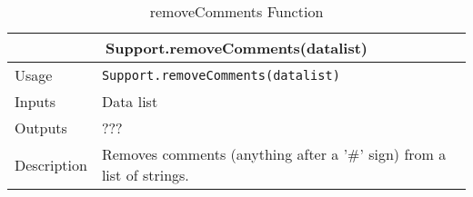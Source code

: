 \begin{table}[H]
\caption{removeComments Function}
\begin{tabular}{ |p{2cm}||p{11cm}|  }
 \hline
 \multicolumn{2}{|c|}{\cellcolor{teal}\textbf{Support.removeComments(datalist)}} \\
 \hline
 Usage & \texttt{Support.removeComments(datalist)}\\ \hline
 Inputs & Data list \\ \hline
 Outputs &  ???  \\ \hline
 Description & Removes comments (anything after a '\#' sign) from a list of strings. \\ \hline
\end{tabular}
\end{table}

 
